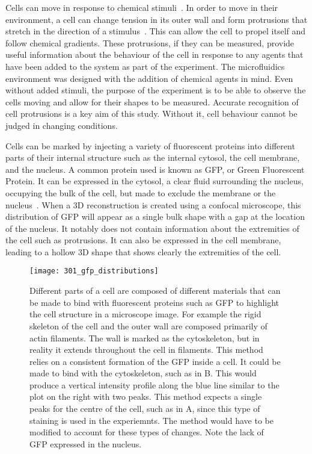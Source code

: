 Cells can move in response to chemical stimuli~\cite{Stetler:93}. In order to move in their environment, a cell can change tension in its outer wall and form protrusions that stretch in the direction of a stimulus~\cite{Stetler:93}. This can allow the cell to propel itself and follow chemical gradients. These protrusions, if they can be measured, provide useful information about the behaviour of the cell in response to any agents that have been added to the system as part of the experiment. The microfluidics environment was designed with the addition of chemical agents in mind. Even without added stimuli, the purpose of the experiment is to be able to observe the cells moving and allow for their shapes to be measured. Accurate recognition of cell protrusions is a key aim of this study. Without it, cell behaviour cannot be judged in changing conditions.

Cells can be marked by injecting a variety of fluorescent proteins into different parts of their internal structure such as the internal cytosol, the cell membrane, and the nucleus. A common protein used is known as GFP, or Green Fluorescent Protein. It can be expressed in the cytosol, a clear fluid surrounding the nucleus, occupying the bulk of the cell, but made to exclude the membrane or the nucleus~\cite{Zou:05}. When a 3D reconstruction is created using a confocal microscope, this distribution of GFP will appear as a single bulk shape with a gap at the location of the nucleus. It notably does not contain information about the extremities of the cell such as protrusions. It can also be expressed in the cell membrane, leading to a hollow 3D shape that shows clearly the extremities of the cell.

\begin{figure}[h!]
 \centering
 \texttt{[image: 301\_gfp\_distributions]}
 \caption[Possible GFP distributions]{
	Different parts of a cell are composed of different materials that can be made to bind with fluorescent proteins such as GFP to highlight the cell structure in a microscope image. For example the rigid skeleton of the cell and the outer wall are composed primarily of actin filaments. The wall is marked as the cytoskeleton, but in reality it extends throughout the cell in filaments. This method relies on a consistent formation of the GFP inside a cell. It could be made to bind with the cytoskeleton, such as in B. This would produce a vertical intensity profile along the blue line similar to the plot on the right with two peaks. This method expects a single peaks for the centre of the cell, such as in A, since this type of staining is used in the experiemnts. The method would have to be modified to account for these types of changes. Note the lack of GFP expressed in the nucleus.
 }
 \label{fig:gfpdistributions}
\end{figure}

